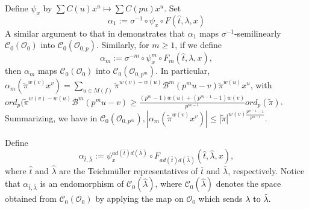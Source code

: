 \documentclass{article}
\theoremstyle{remark}
\def\c #1{ {\mathcal #1} }
\begin{document}
Define $\psi_x$ by $\sum C(u) x^u \mapsto \sum C(p u) x^u$. Set
\[
\alpha_1 :=  \sigma^{-1} \circ \psi_x \circ F(\hat t, \lambda, x)
\]
A similar argument to that in \cite{MR3239170} demonstrates that $\alpha_1$ maps $\sigma^{-1}$-semilinearly $\c C_0(\c O_0)$ into $\c C_0( \c O_{0, p})$. Similarly, for $m \geq 1$, if we define
\[
\alpha_m := \sigma^{-m} \circ \psi_x^m \circ F_m(\hat t, \lambda, x),
\]
then $\alpha_m$ maps $\c C_0(\c O_0)$ into $\c C_0(\c O_{0, p^m})$. In particular, $\alpha_m(\tilde{\pi}^{w(v)} x^v) = \sum_{u \in M(f)} \tilde{\pi}^{w(v)-w(u)}\mathcal{B}^m(p^m u -v) \tilde{\pi}^{w(u)} x^u$, with $ord_p(\tilde{\pi}^{w(v)-w(u)}\mathcal{B}^m(p^m u -v)  \geq \frac{(p^m - 1)w(u) + (p^{m-1} -1)w(v)}{p^{m-1}} ord_p( \tilde{\pi})$. Summarizing, we have in $\c C_0(\c O_{0,p^m}),  |\alpha_m(\tilde{\pi}^{w(v)}x^v)| \leq |\tilde{\pi}|^{w(v) \frac{p^{m-1} -1}{p^{m-1}}}$.




\bigskip{} Define
\[
\alpha_{\bar t, \bar \lambda} := \psi_x^{a d(\bar t) d(\bar \lambda)} \circ F_{a d(\bar t) d(\bar \lambda)}(\hat t, \hat \lambda, x),
\]
where $\hat t$ and $\hat \lambda$ are the Teichm\"uller representatives of $\bar t$ and $\bar \lambda$, respectively. Notice that $\alpha_{\bar t, \bar \lambda}$ is an endomorphism of $\c C_0(\hat \lambda)$, where $\c C_0(\hat \lambda)$ denotes the space obtained from $\c C_0(\c O_0)$ by applying the map on  $\c O_0$  which sends  $\lambda \ \textup{to} \ \hat \lambda.$
\end{document}
